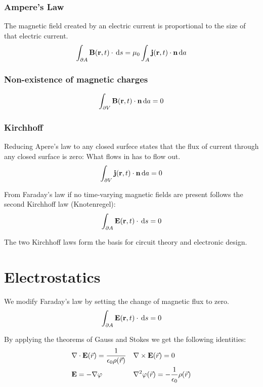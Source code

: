 \documentclass[a4paper, fontsize=8pt, landscape, DIV=1]{scrartcl}
\begin{document}
\begin{multicols*}{4}
  \subsubsection{Ampere's Law}
  The magnetic field created by an electric current is proportional to the size of that electric current.
  \[\int_{\partial A}\mathbf{B}(\mathbf{r},t)\cdot \,\mathrm{d} s = \mu_0 \int_A \mathbf{j}(\mathbf{r},t)\cdot \mathbf{n} \,\mathrm{d} a \]

  \subsubsection{Non-existence of magnetic charges}

  \[\int_{\partial V}\mathbf{B}(\mathbf{r},t)\cdot \mathbf{n} \,\mathrm{d} a = 0 \]
  
  \subsubsection{Kirchhoff}
  Reducing Apere's law to any closed surfece states that the flux of current through any closed surface is zero: What flows in has to flow out.
  \[ \int_{\partial V} \mathbf{j}(\mathbf{r},t) \cdot \mathbf{n}\,\mathrm{d} a = 0 \]

  From Faraday's law if no time-varying magnetic fields are present follows the second Kirchhoff law (Knotenregel):
  \[ \int_{\partial A} \mathbf{E}(\mathbf{r},t)\cdot \,\mathrm{d} s = 0 \]

  The two Kirchhoff laws form the basis for circuit theory and electronic design.

  \section{Electrostatics}
  We modify Faraday's law by setting the change of magnetic flux to zero. 
  \[\int_{\partial A}\mathbf{E}(\mathbf{r},t)\cdot \,\mathrm{d} s = 0 \]

  By applying the theorems of Gauss and Stokes we get the following identities:
  \begin{align*}
    &\nabla \cdot \mathbf{E}(\vec{r}) = \frac{1}{\epsilon_0\rho(\vec{r})} & &\nabla\times\mathbf{E}(\vec{r}) = 0 \\
    &\mathbf{E} = -\nabla\varphi & &\nabla^2\varphi(\vec{r}) = -\frac{1}{\epsilon_0}\rho(\vec{r})
  \end{align*}


\end{multicols*}
\end{document}
